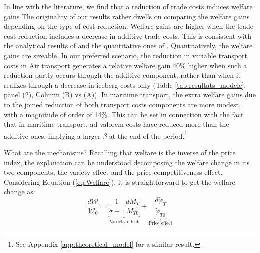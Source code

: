 \documentclass[a4paper,11pt]{article}
\begin{document}
In line with the literature, we find that a reduction of trade costs  induces welfare gains
The originality of our results rather dwells on comparing the welfare gains depending on the type of cost reduction.
Welfare gains are higher when the trade cost reduction includes a decrease in additive trade costs.
This is consistent with the analytical results of \cite{sorensen2014} and the quantitative ones of \cite{Irrazabal_2015}.
Quantitatively, the welfare gains are sizeable. In our preferred scenario, the reduction in variable transport costs in Air transport generates a relative welfare gain 40\% higher when such a reduction partly occurs through the additive component, rather than when it realizes through a decrease in iceberg costs only (Table \ref{tab:resultats_modele}, panel (2), Column (B) vs (A)). In maritime transport, the extra welfare gains due to the joined reduction of both transport costs components are more modest, with a magnitude of order of 14\%. This can be set in connection with the fact that in maritime transport, ad-valorem costs have reduced more than the additive ones, implying a larger $\beta$ at the end of the period.\footnote{See Appendix \ref{app:theoretical_model} for a similar result.}
\smallskip

What are the mechanisms? Recalling that welfare is the inverse of the price index, the explanation can be understood decomposing the welfare change in its two components, the variety effect and the price competitiveness effect. Considering Equation (\ref{eq:Welfare}), it is straightforward to get the welfare change as:
\begin{equation}
\frac{d\mathcal{W}}{\mathcal{W}_0} = \underbrace{\frac{1}{\sigma-1} \frac{d M_T}{M_{T0}}}_{\text{Variety effect}} +  \underbrace{\frac{d\widetilde{\varphi}_T}{\widetilde{\varphi}_{T0}}}_{\text{Price effect}} \label{eq:decompWelfare}
\end{equation}
\end{document}

